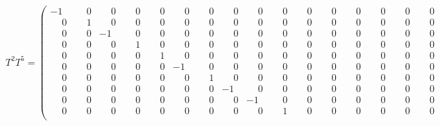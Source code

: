 \documentclass[10pt]{article}
\begin{document}
\[
T^{2}T^{5} = \left(\begin{smallmatrix}
-1 & \phantom{-}0 & \phantom{-}0 & \phantom{-}0 & \phantom{-}0 & \phantom{-}0 & \phantom{-}0 & \phantom{-}0 & \phantom{-}0 & \phantom{-}0 & \phantom{-}0 & \phantom{-}0 & \phantom{-}0 & \phantom{-}0 & \phantom{-}0 & \phantom{-}0 \\
\phantom{-}0 & \phantom{-}1 & \phantom{-}0 & \phantom{-}0 & \phantom{-}0 & \phantom{-}0 & \phantom{-}0 & \phantom{-}0 & \phantom{-}0 & \phantom{-}0 & \phantom{-}0 & \phantom{-}0 & \phantom{-}0 & \phantom{-}0 & \phantom{-}0 & \phantom{-}0 \\
\phantom{-}0 & \phantom{-}0 & -1 & \phantom{-}0 & \phantom{-}0 & \phantom{-}0 & \phantom{-}0 & \phantom{-}0 & \phantom{-}0 & \phantom{-}0 & \phantom{-}0 & \phantom{-}0 & \phantom{-}0 & \phantom{-}0 & \phantom{-}0 & \phantom{-}0 \\
\phantom{-}0 & \phantom{-}0 & \phantom{-}0 & \phantom{-}1 & \phantom{-}0 & \phantom{-}0 & \phantom{-}0 & \phantom{-}0 & \phantom{-}0 & \phantom{-}0 & \phantom{-}0 & \phantom{-}0 & \phantom{-}0 & \phantom{-}0 & \phantom{-}0 & \phantom{-}0 \\
\phantom{-}0 & \phantom{-}0 & \phantom{-}0 & \phantom{-}0 & \phantom{-}1 & \phantom{-}0 & \phantom{-}0 & \phantom{-}0 & \phantom{-}0 & \phantom{-}0 & \phantom{-}0 & \phantom{-}0 & \phantom{-}0 & \phantom{-}0 & \phantom{-}0 & \phantom{-}0 \\
\phantom{-}0 & \phantom{-}0 & \phantom{-}0 & \phantom{-}0 & \phantom{-}0 & -1 & \phantom{-}0 & \phantom{-}0 & \phantom{-}0 & \phantom{-}0 & \phantom{-}0 & \phantom{-}0 & \phantom{-}0 & \phantom{-}0 & \phantom{-}0 & \phantom{-}0 \\
\phantom{-}0 & \phantom{-}0 & \phantom{-}0 & \phantom{-}0 & \phantom{-}0 & \phantom{-}0 & \phantom{-}1 & \phantom{-}0 & \phantom{-}0 & \phantom{-}0 & \phantom{-}0 & \phantom{-}0 & \phantom{-}0 & \phantom{-}0 & \phantom{-}0 & \phantom{-}0 \\
\phantom{-}0 & \phantom{-}0 & \phantom{-}0 & \phantom{-}0 & \phantom{-}0 & \phantom{-}0 & \phantom{-}0 & -1 & \phantom{-}0 & \phantom{-}0 & \phantom{-}0 & \phantom{-}0 & \phantom{-}0 & \phantom{-}0 & \phantom{-}0 & \phantom{-}0 \\
\phantom{-}0 & \phantom{-}0 & \phantom{-}0 & \phantom{-}0 & \phantom{-}0 & \phantom{-}0 & \phantom{-}0 & \phantom{-}0 & -1 & \phantom{-}0 & \phantom{-}0 & \phantom{-}0 & \phantom{-}0 & \phantom{-}0 & \phantom{-}0 & \phantom{-}0 \\
\phantom{-}0 & \phantom{-}0 & \phantom{-}0 & \phantom{-}0 & \phantom{-}0 & \phantom{-}0 & \phantom{-}0 & \phantom{-}0 & \phantom{-}0 & \phantom{-}1 & \phantom{-}0 & \phantom{-}0 & \phantom{-}0 & \phantom{-}0 & \phantom{-}0 & \phantom{-}0 \\

\end{smallmatrix}\]
\end{document}
